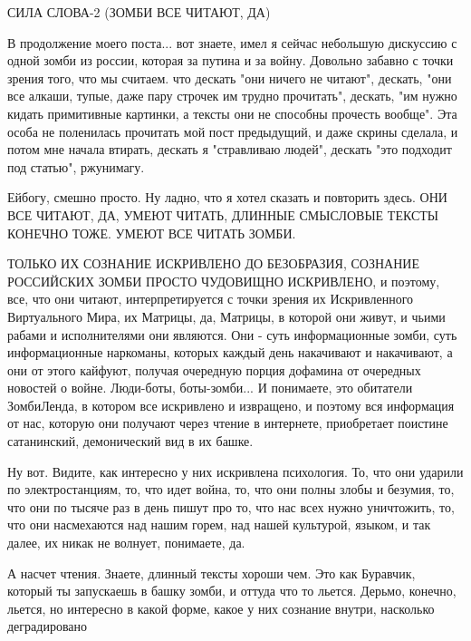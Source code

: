  
 
 
 
 

СИЛА СЛОВА-2 (ЗОМБИ ВСЕ ЧИТАЮТ, ДА)

В продолжение моего поста... вот знаете, имел я сейчас небольшую дискуссию с
одной зомби из россии, которая за путина и за войну. Довольно забавно с точки
зрения того, что мы считаем. что дескать "они ничего не читают", дескать, "они
все алкаши, тупые, даже пару строчек им трудно прочитать", дескать, "им нужно
кидать примитивные картинки, а тексты они не способны прочесть вообще". Эта
особа не поленилась прочитать мой пост предыдущий, и даже скрины сделала, и
потом мне начала втирать, дескать я "стравливаю людей", дескать "это подходит
под статью", ржунимагу.

Ейбогу, смешно просто. Ну ладно, что я хотел сказать и повторить здесь. ОНИ ВСЕ
ЧИТАЮТ, ДА, УМЕЮТ ЧИТАТЬ, ДЛИННЫЕ СМЫСЛОВЫЕ ТЕКСТЫ КОНЕЧНО ТОЖЕ. УМЕЮТ ВСЕ
ЧИТАТЬ ЗОМБИ.  

ТОЛЬКО ИХ СОЗНАНИЕ ИСКРИВЛЕНО ДО БЕЗОБРАЗИЯ, СОЗНАНИЕ РОССИЙСКИХ ЗОМБИ ПРОСТО
ЧУДОВИЩНО ИСКРИВЛЕНО, и поэтому, все, что они читают, интерпретируется с точки
зрения их Искривленного Виртуального Мира, их Матрицы, да, Матрицы, в которой
они живут, и чьими рабами и исполнителями они являются. Они - суть
информационные зомби, суть информационные наркоманы, которых каждый день
накачивают и накачивают, а они от этого кайфуют, получая очередную порция
дофамина от очередных новостей о войне. Люди-боты, боты-зомби... И понимаете,
это обитатели ЗомбиЛенда, в котором все искривлено и извращено, и поэтому вся
информация от нас, которую они получают через чтение в интернете, приобретает
поистине сатанинский, демонический вид в их башке. 

Ну вот. Видите, как интересно у них искривлена психология. То, что они ударили
по электростанциям, то, что идет война, то, что они полны злобы и безумия, то,
что они по тысяче раз в день пишут про то, что нас всех нужно уничтожить, то,
что они насмехаются над нашим горем, над нашей культурой, языком, и так далее,
их никак не волнует, понимаете, да. 

А насчет чтения. Знаете, длинный тексты хороши чем. Это как Буравчик, который
ты запускаешь в башку зомби, и оттуда что то льется. Дерьмо, конечно, льется,
но интересно в какой форме, какое у них сознание внутри, насколько
деградировано

